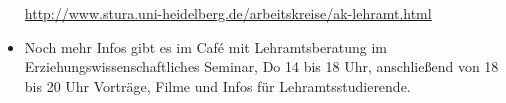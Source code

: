 \begin{itemize}
      \url{http://www.stura.uni-heidelberg.de/arbeitskreise/ak-lehramt.html}



\item Noch mehr Infos gibt es im Café mit Lehramtsberatung im
      Erziehungswissenschaftliches Seminar, Do 14 bis 18 Uhr,
      anschließend von 18 bis 20 Uhr Vorträge, Filme und Infos für
      Lehramtsstudierende.
\end{itemize}


